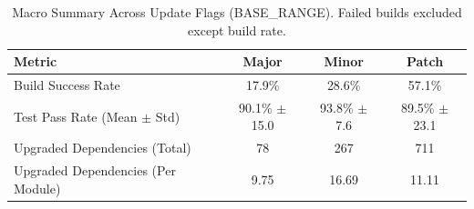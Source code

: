 \begin{table}[htbp]
\centering
\caption{Macro Summary Across Update Flags (BASE_RANGE). Failed builds excluded except build rate.}
\label{tab:base_range_macro_summary}
\begin{tabular}{lccc}
\toprule
\textbf{Metric} & \textbf{Major} & \textbf{Minor} & \textbf{Patch} \\
\midrule
Build Success Rate & 17.9\% & 28.6\% & 57.1\% \\
Test Pass Rate (Mean $\pm$ Std) & 90.1\% $\pm$ 15.0 & 93.8\% $\pm$ 7.6 & 89.5\% $\pm$ 23.1 \\
Upgraded Dependencies (Total) & 78 & 267 & 711 \\
Upgraded Dependencies (Per Module) & 9.75 & 16.69 & 11.11 \\
\bottomrule
\end{tabular}
\end{table}
